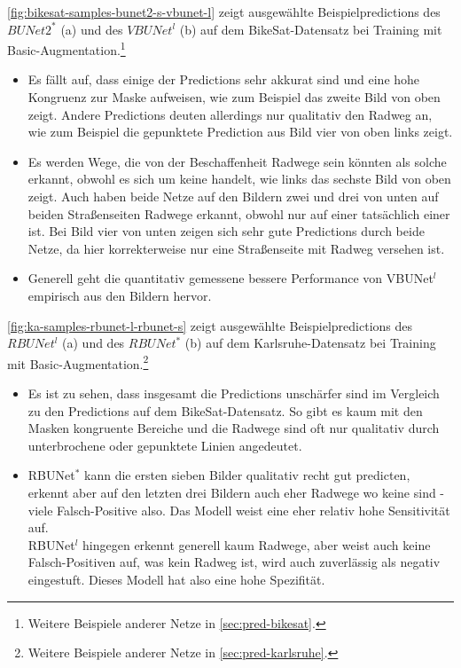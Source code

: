 \autoref{fig:bikesat-samples-bunet2-s-vbunet-l} zeigt ausgewählte Beispielpredictions des $BUNet2^*$ (a) und 
des $VBUNet^l$ (b) auf dem BikeSat-Datensatz bei Training mit Basic-Augmentation.\footnote{Weitere Beispiele anderer Netze in \autoref{sec:pred-bikesat}.}
\begin{itemize}
	\item Es fällt auf, dass einige der Predictions sehr akkurat sind und eine hohe Kongruenz zur Maske aufweisen,
	wie zum Beispiel das zweite Bild von oben zeigt. Andere Predictions deuten allerdings nur qualitativ den Radweg an, 
	wie zum Beispiel die gepunktete Prediction aus Bild vier von oben links zeigt.
	\item Es werden Wege, die von der Beschaffenheit Radwege sein könnten als solche erkannt, 
	obwohl es sich um keine handelt, wie links das sechste Bild von oben zeigt. Auch haben beide Netze 
	auf den Bildern zwei und drei von unten auf beiden Straßenseiten Radwege erkannt, obwohl nur auf einer tatsächlich einer ist.
	Bei Bild vier von unten zeigen sich sehr gute Predictions durch beide Netze, da hier korrekterweise nur eine Straßenseite 
	mit Radweg versehen ist. 
	\item Generell geht die quantitativ gemessene bessere Performance von VBUNet$^l$ empirisch aus den Bildern hervor.
\end{itemize}

\autoref{fig:ka-samples-rbunet-l-rbunet-s} zeigt ausgewählte Beispielpredictions des $RBUNet^l$ (a) und 
des $RBUNet^*$ (b) auf dem Karlsruhe-Datensatz bei Training mit Basic-Augmentation.\footnote{Weitere Beispiele anderer Netze in \autoref{sec:pred-karlsruhe}.}
\begin{itemize}
	\item Es ist zu sehen, dass insgesamt die Predictions unschärfer sind im Vergleich zu den Predictions auf dem 
	BikeSat-Datensatz. So gibt es kaum mit den Masken kongruente Bereiche und die Radwege sind oft nur 
	qualitativ durch unterbrochene oder gepunktete Linien angedeutet. 
	\item RBUNet$^*$ kann die ersten sieben Bilder qualitativ recht gut predicten, erkennt aber auf den letzten 
	drei Bildern auch eher Radwege wo keine sind - viele Falsch-Positive also. 
	Das Modell weist eine eher relativ hohe Sensitivität auf. \\
	RBUNet$^l$ hingegen erkennt generell kaum Radwege, aber weist auch keine Falsch-Positiven auf, 
	was kein Radweg ist, wird auch zuverlässig als negativ eingestuft. Dieses Modell hat also eine hohe Spezifität.     
\end{itemize}

